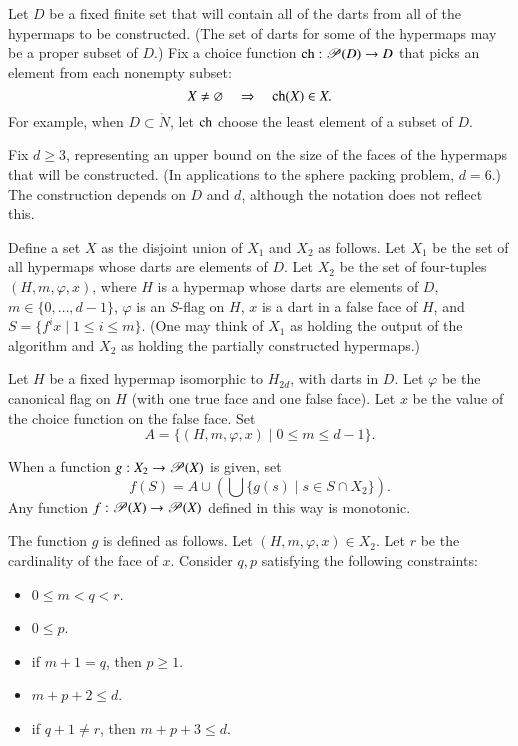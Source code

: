 Let $D$ be a fixed finite set that will contain all of the darts from
all of the hypermaps to be constructed.  (The set of darts for some of
the hypermaps may be a proper subset of $D$.)  Fix a choice function
${\operatorname{ch}}:{\mathscr P}(D)\to D$ that picks an element from each nonempty
subset:
\begin{displaymath}
X\ne\varnothing\quad  \Rightarrow \quad  {\operatorname{ch}}(X)\in X.
\end{displaymath}
 For example, when
$D\subset\ring{N}$, let ${\operatorname{ch}}$ choose the least element of a subset
of $D$.

Fix $d\ge 3$, representing an upper bound on the size of the faces of
the hypermaps that will be constructed.  (In applications to the
sphere packing problem, $d=6$.)  The construction depends on $D$ and
$d$, although the notation does not reflect this.
%

Define a set $X$ as the disjoint union of $X_1$ and $X_2$ as follows.
Let $X_1$ be the set of all hypermaps whose darts are elements of $D$.
Let $X_2$ be the set of four-tuples $(H,m,\varphi,x)$, where $H$ is a
hypermap whose darts are elements of $D$, $m\in\{0,\ldots,d-1\}$,
$\varphi$ is an $S$-flag on $H$, $x$ is a dart in a false face of $H$,
and $S = \{f^i x\mid 1 \le i \le m\}$.  (One may think of $X_1$ as
holding the output of the algorithm and $X_2$ as holding the partially
constructed hypermaps.)

Let $H$ be a fixed hypermap isomorphic to $H_{2d}$, with darts in $D$.
Let $\varphi$ be the canonical flag on $H$ (with one true face and one
false face).  Let $x$ be the value of the choice function on the false
face.  Set
\begin{displaymath}A = \{(H,m,\varphi,x) \mid 0\le m \le d-1
\}.\end{displaymath}

When a function 
$g:X_2 \to {\mathscr P}(X)$ is given, set 
\begin{displaymath}f(S) = A \cup (\bigcup \{g(s) \mid s\in S\cap
X_2\}).\end{displaymath} Any function $f :{\mathscr P}(X)\to
{\mathscr P}(X)$ defined in this way is monotonic.  %

The function $g$ is defined as follows.  Let $(H,m,\varphi,x)\in X_2$.
Let $r$ be the cardinality of the face of $x$.  Consider $q,p$
satisfying the following constraints:
\begin{itemize}
\item $0\le m < q < r$.
\item $0\le p$.
\item if $m+1 = q$, then $p \ge 1$.
\item $m+p+2 \le d$.
\item if $q+1\ne r$, then $m+p+3\le d$.
\end{itemize}

